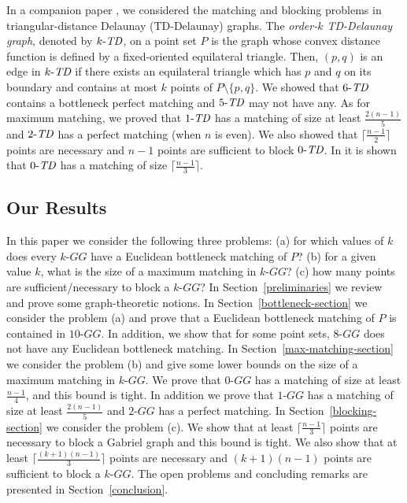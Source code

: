 \documentclass[11pt,a4paper]{article}
\newcommand{\kTD}[2]{$#1\text{-{\em TD}}#2$}
\newcommand{\kGG}[2]{$#1\text{-}GG#2$}
\begin{document}
In a companion paper \cite{Biniaz2014}, we considered the matching and blocking problems in triangular-distance Delaunay (TD-Delaunay) graphs. The {\em order-$k$ TD-Delaunay graph}, denoted by \kTD{k}{}, on a point set $P$ is the graph whose convex distance function is
defined by a fixed-oriented equilateral triangle. Then, $(p,q)$ is an edge in \kTD{k}{} if there exists an equilateral triangle which has $p$ and $q$ on its boundary and contains at most $k$ points of $P\setminus\{p,q\}$. We showed that \kTD{6}{} contains a bottleneck perfect matching and \kTD{5}{} may not have any. As for maximum matching, we proved that \kTD{1}{} has a matching of size at least $\frac{2(n-1)}{5}$ and \kTD{2}{} has a perfect matching (when $n$ is even). We also showed that $\lceil\frac{n-1}{2}\rceil$ points are necessary and $n-1$ points are sufficient to block \kTD{0}{}. In \cite{Babu2013} it is shown that \kTD{0}{} has a matching of size $\lceil\frac{n-1}{3}\rceil$. 

\subsection{Our Results}
In this paper we consider the following three problems: (a) for which values of $k$ does every \kGG{k}{} have a Euclidean bottleneck matching of $P$? (b) for a given value $k$, what is the size of a maximum matching in \kGG{k}{}? (c) how many points are sufficient/necessary to block a \kGG{k}{}? In Section~\ref{preliminaries} we review and prove some graph-theoretic notions. In Section~\ref{bottleneck-section} we consider the problem (a) and prove that a Euclidean bottleneck matching of $P$ is contained in \kGG{10}{}. In addition, we show that for some point sets, \kGG{8}{} does not have any Euclidean bottleneck matching. In Section~\ref{max-matching-section} we consider the problem (b) and give some lower bounds on the size of a maximum matching in \kGG{k}{}. We prove that \kGG{0}{} has a matching of size at least $\frac{n-1}{4}$, and this bound is tight. In addition we prove that \kGG{1}{} has a matching of size at least $\frac{2(n-1)}{5}$ and \kGG{2}{} has a perfect matching. In Section~\ref{blocking-section} we consider the problem (c). We show that at least $\lceil\frac{n-1}{3}\rceil$ points are necessary to block a Gabriel graph and this bound is tight. We also show that at least $\lceil\frac{(k+1)(n-1)}{3}\rceil$ points are necessary and $(k+1)(n-1)$ points are sufficient to block a \kGG{k}{}. The open problems and concluding remarks are presented in Section~\ref{conclusion}.
\end{document}
